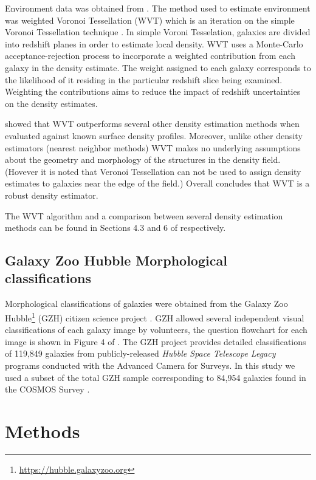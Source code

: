 \documentclass[a4paper,fleqn,usenatbib]{mnras}
\begin{document}
   Environment data was obtained from \cite{darvish2015}. The method used to estimate environment was weighted
   Voronoi Tessellation (WVT) which is an iteration on the simple Voronoi Tessellation technique \citep{ebeling1993,bernardeau1996}.
   In simple Voroni Tesselation, galaxies are divided into redshift planes in order to estimate local density.
   WVT uses a Monte-Carlo acceptance-rejection process to incorporate a weighted contribution from each galaxy
   in the density estimate. The weight assigned to each galaxy corresponds to the likelihood of it residing in the 
   particular redshift slice being examined. Weighting the contributions aims to reduce the impact of redshift uncertainties
   on the density estimates.

   \cite{darvish2015} showed that WVT outperforms several other density estimation methods when evaluated 
   against known surface density profiles. Moreover, unlike other density estimators (nearest neighbor methods) 
   WVT makes no underlying assumptions about the geometry and morphology of the structures in the density field. 
   (Hovever it is noted that Veronoi Tessellation can not be used to assign density estimates to galaxies near the
   edge of the field.) Overall \cite{darvish2015} concludes that WVT is a robust density estimator. 

   The WVT algorithm and a comparison between several density estimation methods can be found 
   in Sections 4.3 and 6 of \cite{darvish2015} respectively. 

   \subsection{Galaxy Zoo Hubble Morphological classifications}
   
   Morphological classifications of galaxies were obtained from the Galaxy Zoo Hubble\footnote{\url{https://hubble.galaxyzoo.org}} (GZH) citizen 
   science project \citep{galaxyzooHubble}. GZH allowed several independent visual classifications of each galaxy image by volunteers, the question flowchart for each
   image is shown in Figure 4 of \cite{galaxyzooHubble}. The GZH project provides detailed classifications of 119,849 galaxies from publicly-released \textit{Hubble
   Space Telescope Legacy} programs conducted with the Advanced Camera for Surveys. In this study we used a subset of the total GZH sample corresponding to 84,954
   galaxies found in the COSMOS Survey \citep{scoville2007,koekemoer2007}.

\section{Methods}   
\end{document}
